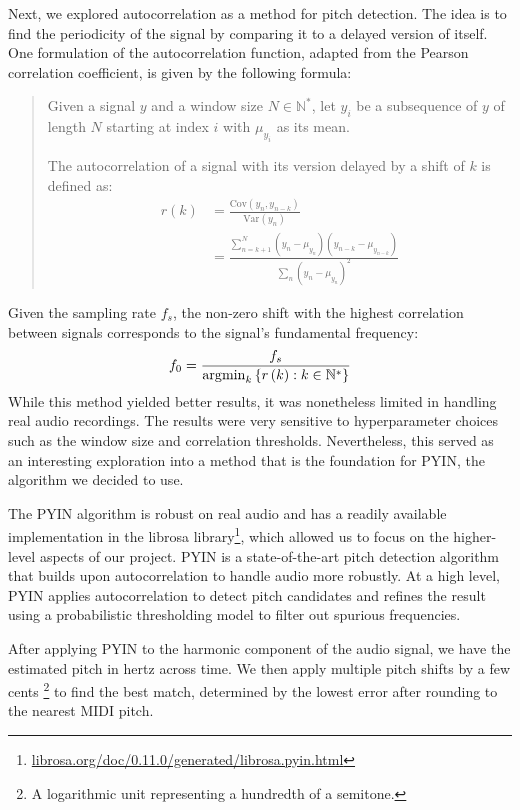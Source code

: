
Next, we explored autocorrelation as a method for pitch detection. The idea is to find the periodicity of the signal by comparing it to a delayed version of itself. One formulation of the autocorrelation function, adapted from the Pearson correlation coefficient, is given by the following formula:
\begin{quote}
    Given a signal $y$ and a window size $N \in \mathbb N^\ast$, let $y_i$ be a subsequence of $y$ of length $N$ starting at index $i$ with $\mu_{y_i}$ as its mean.
    
    The autocorrelation of a signal with its version delayed by a shift of $k$ is defined as:
    \begin{align*}
        r\left(k\right)
        &= \frac{\text{Cov}\left(y_n, y_{n-k}\right)}{\text{Var}\left(y_n\right)} \\
        &= \frac{\sum_{n=k+1}^N \left(y_n - \mu_{y_n}\right) \left(y_{n-k} - \mu_{y_{n-k}}\right)}{\sum_n \left(y_n - \mu_{y_n}\right)^2}
    \end{align*}
\end{quote}
Given the sampling rate $f_s$, the non-zero shift with the highest correlation between signals corresponds to the signal's fundamental frequency:
$$f_0 = \frac{f_s}{\operatorname*{\arg\!\min}_{k}\left\{ r\left(k\right) : k \in \mathbb N^\ast \right\}}$$
While this method yielded better results, it was nonetheless limited in handling real audio recordings. The results were very sensitive to hyperparameter choices such as the window size and correlation thresholds. Nevertheless, this served as an interesting exploration into a method that is the foundation for PYIN, the algorithm we decided to use.


The PYIN algorithm \autocite{PYIN:2014} is robust on real audio and has a readily available implementation in the librosa library\footnote{\href{https://librosa.org/doc/0.11.0/generated/librosa.pyin.html}{librosa.org/doc/0.11.0/generated/librosa.pyin.html}}, which allowed us to focus on the higher-level aspects of our project. PYIN is a state-of-the-art pitch detection algorithm that builds upon autocorrelation to handle audio more robustly. At a high level, PYIN applies autocorrelation to detect pitch candidates and refines the result using a probabilistic thresholding model to filter out spurious frequencies.

After applying PYIN to the harmonic component of the audio signal, we have the estimated pitch in hertz across time. We then apply multiple pitch shifts by a few cents \footnote{A logarithmic unit representing a hundredth of a semitone.} to find the best match, determined by the lowest error after rounding to the nearest MIDI pitch.

